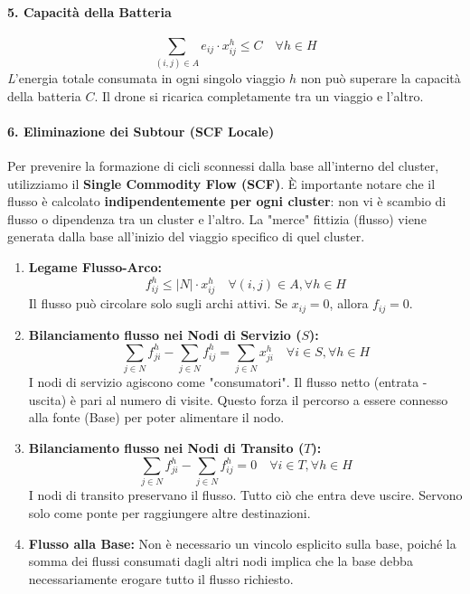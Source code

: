 \documentclass{article}
\begin{document}
\paragraph{5. Capacità della Batteria}
\begin{equation}
    \sum_{(i,j) \in A} e_{ij} \cdot x_{ij}^h \le C \quad \forall h \in H
\end{equation}
\textit   L'energia totale consumata in ogni singolo viaggio $h$ non può superare la capacità della batteria $C$. Il drone si ricarica completamente tra un viaggio e l'altro.

\paragraph{6. Eliminazione dei Subtour (SCF Locale)}

Per prevenire la formazione di cicli sconnessi dalla base all'interno del cluster, utilizziamo il \textbf{Single Commodity Flow (SCF)}.
È importante notare che il flusso è calcolato \textbf{indipendentemente per ogni cluster}: non vi è scambio di flusso o dipendenza tra un cluster e l'altro. La "merce" fittizia (flusso) viene generata dalla base all'inizio del viaggio specifico di quel cluster.

\begin{enumerate}
    \item \textbf{Legame Flusso-Arco:}
    \begin{equation}
        f_{ij}^h \le |N| \cdot x_{ij}^h \quad \forall (i,j) \in A, \forall h \in H
    \end{equation}
    Il flusso può circolare solo sugli archi attivi. Se $x_{ij}=0$, allora $f_{ij}=0$.

    \item \textbf{Bilanciamento flusso nei Nodi di Servizio ($S$):}
    \begin{equation}
        \sum_{j \in N} f_{ji}^h - \sum_{j \in N} f_{ij}^h = \sum_{j \in N} x_{ji}^h \quad \forall i \in S, \forall h \in H
    \end{equation}
    I nodi di servizio agiscono come "consumatori". Il flusso netto (entrata - uscita) è pari al numero di visite. Questo forza il percorso a essere connesso alla fonte (Base) per poter alimentare il nodo.

    \item \textbf{Bilanciamento flusso nei Nodi di Transito ($T$):}
    \begin{equation}
        \sum_{j \in N} f_{ji}^h - \sum_{j \in N} f_{ij}^h = 0 \quad \forall i \in T, \forall h \in H
    \end{equation}
    I nodi di transito preservano il flusso. Tutto ciò che entra deve uscire. Servono solo come ponte per raggiungere altre destinazioni.

    \item \textbf{Flusso alla Base:}  
    Non è necessario un vincolo esplicito sulla base, poiché la somma dei flussi consumati dagli altri nodi implica che la base debba necessariamente erogare tutto il flusso richiesto.
\end{enumerate}
\end{document}

